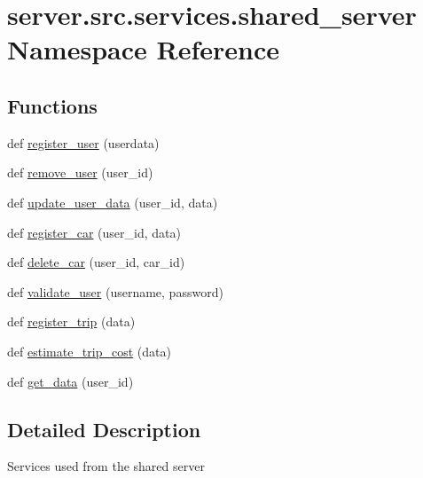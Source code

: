 \hypertarget{namespaceserver_1_1src_1_1services_1_1shared__server}{}\section{server.\+src.\+services.\+shared\+\_\+server Namespace Reference}
\label{namespaceserver_1_1src_1_1services_1_1shared__server}
\subsection*{Functions}
\begin{DoxyCompactItemize}
\item 
def \hyperlink{namespaceserver_1_1src_1_1services_1_1shared__server_ad046220c1ee3d44e032e949a627fe9f8}{register\+\_\+user} (userdata)
\item 
def \hyperlink{namespaceserver_1_1src_1_1services_1_1shared__server_a190f8fa17a9c97c5db8b9d737acc89c8}{remove\+\_\+user} (user\+\_\+id)
\item 
def \hyperlink{namespaceserver_1_1src_1_1services_1_1shared__server_a6c6ee2dbe6c5c9dd02720250ffb9f740}{update\+\_\+user\+\_\+data} (user\+\_\+id, data)
\item 
def \hyperlink{namespaceserver_1_1src_1_1services_1_1shared__server_aa72ddb5c3d008c64e08bea3eccce0d27}{register\+\_\+car} (user\+\_\+id, data)
\item 
def \hyperlink{namespaceserver_1_1src_1_1services_1_1shared__server_a2fd59695eb0b75fa5d0f6c311ea4d71c}{delete\+\_\+car} (user\+\_\+id, car\+\_\+id)
\item 
def \hyperlink{namespaceserver_1_1src_1_1services_1_1shared__server_a8c32ea7706df14abd6fb772d2dd8ccec}{validate\+\_\+user} (username, password)
\item 
def \hyperlink{namespaceserver_1_1src_1_1services_1_1shared__server_ac161e4dbfe6124a8dcb84411527c03c9}{register\+\_\+trip} (data)
\item 
def \hyperlink{namespaceserver_1_1src_1_1services_1_1shared__server_a8a2f31e713bb03bf1cb42fe7ebdd7bc2}{estimate\+\_\+trip\+\_\+cost} (data)
\item 
def \hyperlink{namespaceserver_1_1src_1_1services_1_1shared__server_af10e171335b969947879c4ed45dc011d}{get\+\_\+data} (user\+\_\+id)
\end{DoxyCompactItemize}


\subsection{Detailed Description}
\begin{DoxyVerb}Services used from the shared server\end{DoxyVerb}
 

